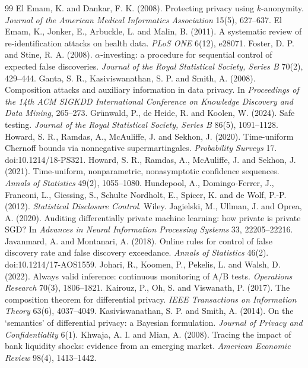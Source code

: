 \documentclass{jpc}
\theoremstyle{remark}
\begin{document}
\begin{thebibliography}{99}
 El Emam, K. and Dankar, F. K. (2008). Protecting privacy using $k$-anonymity. \emph{Journal of the American Medical Informatics Association} 15(5), 627--637.
 El Emam, K., Jonker, E., Arbuckle, L. and Malin, B. (2011). A systematic review of re-identification attacks on health data. \emph{PLoS ONE} 6(12), e28071.
 Foster, D. P. and Stine, R. A. (2008). $\alpha$-investing: a procedure for sequential control of expected false discoveries. \emph{Journal of the Royal Statistical Society, Series B} 70(2), 429--444.
 Ganta, S. R., Kasiviswanathan, S. P. and Smith, A. (2008). Composition attacks and auxiliary information in data privacy. In \emph{Proceedings of the 14th ACM SIGKDD International Conference on Knowledge Discovery and Data Mining}, 265--273.
 Gr\"unwald, P., de Heide, R. and Koolen, W. (2024). Safe testing. \emph{Journal of the Royal Statistical Society, Series B} 86(5), 1091--1128.
 Howard, S. R., Ramdas, A., McAuliffe, J. and Sekhon, J. (2020). Time-uniform Chernoff bounds via nonnegative supermartingales. \emph{Probability Surveys} 17. doi:10.1214/18-PS321.
 Howard, S. R., Ramdas, A., McAuliffe, J. and Sekhon, J. (2021). Time-uniform, nonparametric, nonasymptotic confidence sequences. \emph{Annals of Statistics} 49(2), 1055--1080.
 Hundepool, A., Domingo-Ferrer, J., Franconi, L., Giessing, S., Schulte Nordholt, E., Spicer, K. and de Wolf, P.-P. (2012). \emph{Statistical Disclosure Control}. Wiley.
 Jagielski, M., Ullman, J. and Oprea, A. (2020). Auditing differentially private machine learning: how private is private SGD? In \emph{Advances in Neural Information Processing Systems} 33, 22205--22216.
 Javanmard, A. and Montanari, A. (2018). Online rules for control of false discovery rate and false discovery exceedance. \emph{Annals of Statistics} 46(2). doi:10.1214/17-AOS1559.
 Johari, R., Koomen, P., Pekelis, L. and Walsh, D. (2022). Always valid inference: continuous monitoring of A/B tests. \emph{Operations Research} 70(3), 1806--1821.
 Kairouz, P., Oh, S. and Viswanath, P. (2017). The composition theorem for differential privacy. \emph{IEEE Transactions on Information Theory} 63(6), 4037--4049.
 Kasiviswanathan, S. P. and Smith, A. (2014). On the `semantics' of differential privacy: a Bayesian formulation. \emph{Journal of Privacy and Confidentiality} 6(1).
 Khwaja, A. I. and Mian, A. (2008). Tracing the impact of bank liquidity shocks: evidence from an emerging market. \emph{American Economic Review} 98(4), 1413--1442.

\end{thebibliography}
\end{document}
